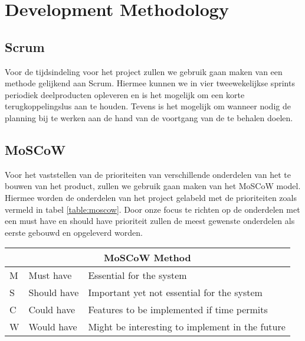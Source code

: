 \section{Development Methodology}
\subsection{Scrum}
Voor de tijdsindeling voor het project zullen we gebruik gaan maken van een methode gelijkend aan Scrum. Hiermee kunnen we in vier tweewekelijkse sprints periodiek deelproducten opleveren en is het mogelijk om een korte terugkoppelingslus aan te houden. Tevens is het mogelijk om wanneer nodig de planning bij te werken aan de hand van de voortgang van de te behalen doelen. 

\subsection{MoSCoW}
Voor het vaststellen van de prioriteiten van verschillende onderdelen van het te bouwen van het product, zullen we gebruik gaan maken van het MoSCoW model. Hiermee worden de onderdelen van het project gelabeld met de prioriteiten zoals vermeld in tabel \ref{table:moscow}. Door onze focus te richten op de onderdelen met een must have en should have prioriteit zullen de meest gewenste onderdelen als eerste gebouwd en opgeleverd worden.\\[1cm]


{\renewcommand{\arraystretch}{1.5}
	\centering
	
	\begin{tabular}{ | l | l | l | }
		\multicolumn{3}{c}{\bfseries{MoSCoW Method}} \\ \hline
		M & Must have & Essential for the system\\ \hline
		S & Should have & Important yet not essential for the system \\ \hline
		C & Could have & Features to be implemented if time permits \\ \hline
		W & Would have & Might be interesting to implement in the future \\ \hline 
	\end{tabular}
	\label{table:moscow}
	
}
